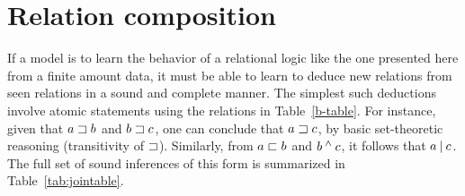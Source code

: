 \section{Relation composition}\label{sec:join}

If a model is to learn the behavior of a relational logic like the one
presented here from a finite amount data, it must be able to learn to
deduce new relations from seen relations in a sound and complete
manner. The simplest such deductions involve atomic statements using
the relations in Table~\ref{b-table}. For instance, given that $a
\sqsupset b$ and $b \sqsupset c$, one can conclude that $a \sqsupset c$, by
basic set-theoretic reasoning (transitivity of $\sqsupset$). Similarly,
from $a \sqsubset b$ and $b \mathbin{^{\wedge}} c$, it follows that $a \mathbin{|} c$.
The full set of sound inferences of this form is summarized in
Table~\ref{tab:jointable}.


